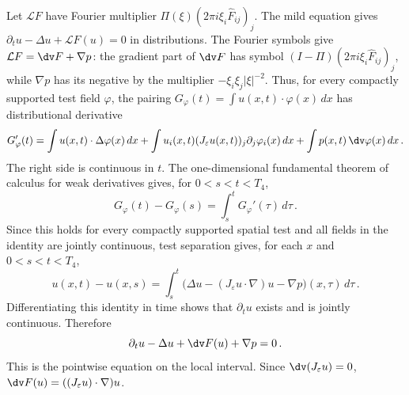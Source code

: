 \documentclass[11pt,reqno]{amsart}
\begin{document}
Let $\mathcal L F$ have Fourier multiplier
$\Pi(\xi)(2\pi i\xi_i\widehat F_{ij})_j$. The mild equation gives
$\partial_tu-\Delta u+\mathcal L F(u)=0$ in distributions. The Fourier
symbols give $\mathcal L F=\dv F+\nabla p$: the gradient part of $\dv F$
has symbol $(I-\Pi)(2\pi i\xi_i\widehat F_{ij})_j$, while $\nabla p$ has
its negative by the multiplier $-\xi_i\xi_j|\xi|^{-2}$. Thus, for every compactly supported test field $\varphi$, the pairing
$G_\varphi(t)=\int u(x,t)\cdot\varphi(x)\,dx$ has distributional derivative
\begin{equation*}
  G_\varphi'(t)=\int u(x,t)\cdot\Delta\varphi(x)\,dx
   +\int u_i(x,t)(J_\varepsilon u(x,t))_j\partial_j\varphi_i(x)\,dx
   +\int p(x,t)\,\dv\varphi(x)\,dx\,.
\end{equation*}
The right side is continuous in $t$. The one-dimensional fundamental
theorem of calculus for weak derivatives gives, for $0<s<t<T_4$,
\begin{equation*}
  G_\varphi(t)-G_\varphi(s)=\int_s^tG_\varphi'(\tau)\,d\tau\,.
\end{equation*}
Since this holds for every compactly supported spatial test and all fields in
the identity are jointly continuous, test separation gives, for each $x$ and
$0<s<t<T_4$,
\begin{equation*}
  u(x,t)-u(x,s)=\int_s^t\bigl(\Delta u-(J_\varepsilon u\cdot\nabla)u
                  -\nabla p\bigr)(x,\tau)\,d\tau\,.
\end{equation*}
Differentiating this identity in time shows that $\partial_tu$ exists and is
jointly continuous. Therefore
\begin{equation}\label{eq:reg-classical-equation}
  \partial_tu-\Delta u+\dv F(u)+\nabla p=0\,.
\end{equation}
This is the pointwise equation on the local interval. Since
$\dv(J_\varepsilon u)=0$,
$\dv F(u)=((J_\varepsilon u)\cdot\nabla)u$.
\end{document}
